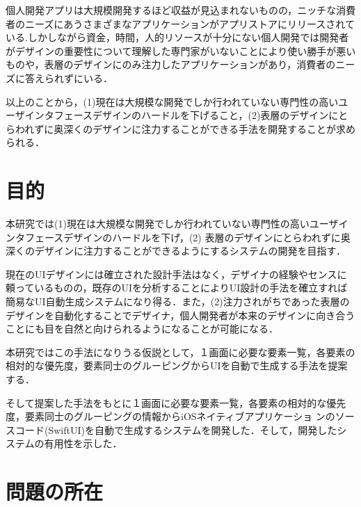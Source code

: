 個人開発アプリは大規模開発するほど収益が見込まれないものの，ニッチな消費者のニーズにあうさまざまなアプリケーションがアプリストアにリリースされている.しかしながら資金，時間，人的リソースが十分にない個人開発では開発者がデザインの重要性について理解した専門家がいないことにより使い勝手が悪いものや，表層のデザインにのみ注力したアプリケーションがあり，消費者のニーズに答えられずにいる．



以上のことから，(1)現在は大規模な開発でしか行われていない専門性の高いユーザインタフェースデザインのハードルを下げること，(2)表層のデザインにとらわれずに奥深くのデザインに注力することができる手法を開発することが求められる．

\section{目的}
本研究では(1)現在は大規模な開発でしか行われていない専門性の高いユーザインタフェースデザインのハードルを下げ，(2) 表層のデザインにとらわれずに奥深くのデザインに注力することができるようにするシステムの開発を目指す．


現在のUIデザインには確立された設計手法はなく，デザイナの経験やセンスに頼っているものの，既存のUIを分析することによりUI設計の手法を確立すれば簡易なUI自動生成システムになり得る．また，(2)注力されがちであった表層のデザインを自動化することでデザイナ，個人開発者が本来のデザインに向き合うことにも目を自然と向けられるようになることが可能になる．

本研究ではこの手法になりうる仮説として，１画面に必要な要素一覧，各要素の相対的な優先度，要素同士のグルーピングからUIを自動で生成する手法を提案する．%

そして提案した手法をもとに１画面に必要な要素一覧，各要素の相対的な優先度，要素同士のグルーピングの情報からiOSネイティブアプリケーショ
ンのソースコード(SwiftUI)を自動で生成するシステムを開発した．そして，開発したシステムの有用性を示した．
\section{問題の所在}

